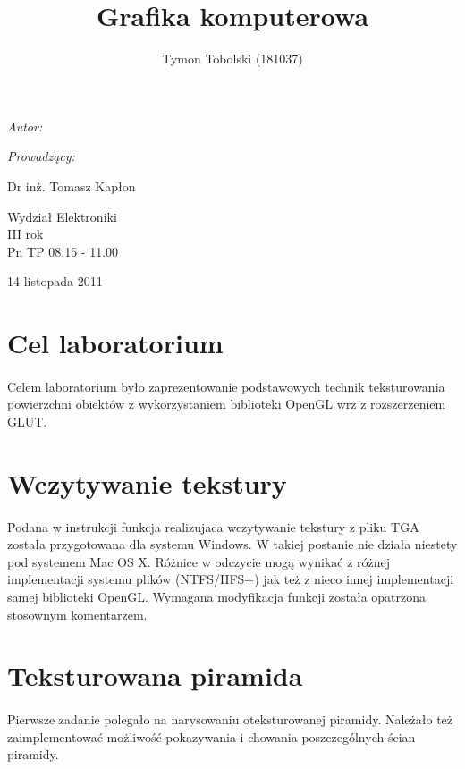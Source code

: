 \documentclass[wide,a4paper,titlepage,12pt] {article}
\title{Grafika komputerowa}
\author{Tymon Tobolski (181037)}
\makeatletter
\renewcommand{\maketitle}{
\begin{titlepage}
  \begin{center}
    \vspace*{3cm}
    \LARGE \@title \par
    \vspace{2cm}
    \textit{\small Autor:}\par
    \normalsize \@author\par \normalsize
    \vspace{3cm}
    \textit{\small Prowadzący:}\par
    Dr inż. Tomasz Kapłon \par
    \vspace{2cm}
    Wydział Elektroniki\\ III rok\\ Pn TP 08.15 - 11.00\par
    \vspace{4cm}
    \small 14 listopada 2011
  \end{center}
\end{titlepage}
}
\makeatother
\begin{document}
\maketitle
  \section{Cel laboratorium}
  \paragraph{}
  Celem laboratorium było zaprezentowanie podstawowych technik teksturowania powierzchni obiektów z wykorzystaniem biblioteki OpenGL wrz z rozszerzeniem GLUT.

  \section{Wczytywanie tekstury}
  \paragraph{}
  Podana w instrukcji funkcja realizujaca wczytywanie tekstury z pliku TGA została przygotowana dla systemu Windows. W takiej postanie nie działa niestety pod systemem Mac OS X. Różnice w odczycie mogą wynikać z różnej implementacji systemu plików (NTFS/HFS+) jak też z nieco innej implementacji samej biblioteki OpenGL. Wymagana modyfikacja funkcji została opatrzona stosownym komentarzem.

  

  \section{Teksturowana piramida}
  \paragraph{}
  Pierwsze zadanie polegało na narysowaniu oteksturowanej piramidy. Należało też zaimplementować możliwość pokazywania i chowania poszczególnych ścian piramidy.

  \paragraph{}
  
\end{document}
